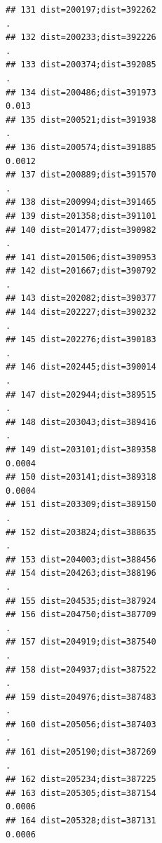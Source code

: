 \documentclass[
]{article}
\begin{document}
\begin{verbatim}
## 131 dist=200197;dist=392262                                              .
## 132 dist=200233;dist=392226                                              .
## 133 dist=200374;dist=392085                                              .
## 134 dist=200486;dist=391973                                          0.013
## 135 dist=200521;dist=391938                                              .
## 136 dist=200574;dist=391885                                         0.0012
## 137 dist=200889;dist=391570                                              .
## 138 dist=200994;dist=391465                                               
## 139 dist=201358;dist=391101                                               
## 140 dist=201477;dist=390982                                              .
## 141 dist=201506;dist=390953                                               
## 142 dist=201667;dist=390792                                              .
## 143 dist=202082;dist=390377                                               
## 144 dist=202227;dist=390232                                              .
## 145 dist=202276;dist=390183                                              .
## 146 dist=202445;dist=390014                                              .
## 147 dist=202944;dist=389515                                              .
## 148 dist=203043;dist=389416                                              .
## 149 dist=203101;dist=389358                                         0.0004
## 150 dist=203141;dist=389318                                         0.0004
## 151 dist=203309;dist=389150                                              .
## 152 dist=203824;dist=388635                                              .
## 153 dist=204003;dist=388456                                               
## 154 dist=204263;dist=388196                                              .
## 155 dist=204535;dist=387924                                               
## 156 dist=204750;dist=387709                                              .
## 157 dist=204919;dist=387540                                              .
## 158 dist=204937;dist=387522                                              .
## 159 dist=204976;dist=387483                                              .
## 160 dist=205056;dist=387403                                              .
## 161 dist=205190;dist=387269                                              .
## 162 dist=205234;dist=387225                                               
## 163 dist=205305;dist=387154                                         0.0006
## 164 dist=205328;dist=387131                                         0.0006

\end{verbatim}
\end{document}
